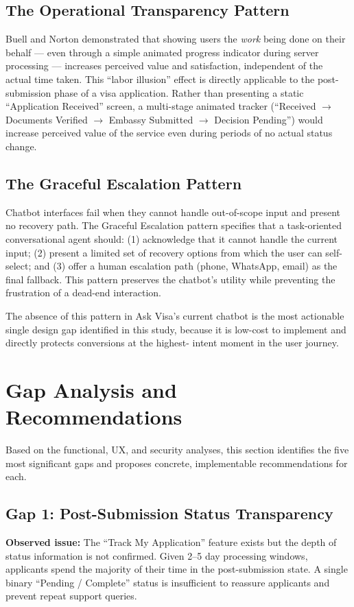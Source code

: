 \documentclass[journal, 10pt, twoside]{IEEEtran}
\begin{document}
\subsection{The Operational Transparency Pattern}
Buell and Norton \cite{buell2011} demonstrated that showing users the
\emph{work} being done on their behalf --- even through a simple animated
progress indicator during server processing --- increases perceived value
and satisfaction, independent of the actual time taken. This ``labor
illusion'' effect is directly applicable to the post-submission phase
of a visa application. Rather than presenting a static ``Application
Received'' screen, a multi-stage animated tracker (``Received $\rightarrow$
Documents Verified $\rightarrow$ Embassy Submitted $\rightarrow$
Decision Pending'') would increase perceived value of the service
even during periods of no actual status change.

\subsection{The Graceful Escalation Pattern}
Chatbot interfaces fail when they cannot handle out-of-scope input and
present no recovery path. The Graceful Escalation pattern specifies
that a task-oriented conversational agent should: (1) acknowledge
that it cannot handle the current input; (2) present a limited set of
recovery options from which the user can self-select; and (3) offer
a human escalation path (phone, WhatsApp, email) as the final fallback.
This pattern preserves the chatbot's utility while preventing the
frustration of a dead-end interaction.

The absence of this pattern in Ask Visa's current chatbot is the most
actionable single design gap identified in this study, because it is
low-cost to implement and directly protects conversions at the highest-
intent moment in the user journey.


\section{Gap Analysis and Recommendations}
\label{sec:gaps}

Based on the functional, UX, and security analyses, this section
identifies the five most significant gaps and proposes concrete,
implementable recommendations for each.

\subsection{Gap 1: Post-Submission Status Transparency}
\textbf{Observed issue:} The ``Track My Application'' feature exists
but the depth of status information is not confirmed. Given 2--5 day
processing windows, applicants spend the majority of their time in
the post-submission state. A single binary ``Pending / Complete''
status is insufficient to reassure applicants and prevent repeat
support queries.
\end{document}
